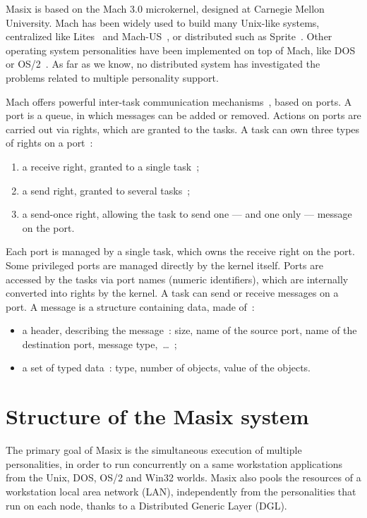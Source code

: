 Masix is based on the Mach 3.0 microkernel, designed at Carnegie Mellon 
University. 
Mach has been widely used to build many Unix-like systems, centralized like
Lites~\cite{Helander94} and Mach-US~\cite{mach-us95}, or distributed
such as Sprite~\cite{Kupfer93}. Other operating system personalities have
been implemented on top of Mach, like DOS~\cite{dos91} or OS/2~\cite{Phelan93}.
As far as we know, no distributed system has investigated the problems
related to multiple personality support.

Mach offers powerful inter-task communication mechanisms~\cite{Draves90},
based on ports. A port is a queue, in which messages can be added or removed.
Actions on ports are carried out via rights, which are granted to the tasks.
A task can own three types of rights on a port~:
\begin {enumerate}
\item a receive right, granted to a single task~;
\item a send right, granted to several tasks~;
\item a send-once right, allowing the task to send one --- and one only --- 
message on the port.
\end {enumerate}

Each port is managed by a single task, which owns the receive right on the
port. Some privileged ports are managed directly by the kernel itself.
Ports are accessed by the tasks via port names (numeric identifiers), which are
internally converted into rights by the kernel. 
A task can send or receive messages on a port. A message is a structure 
containing data, made of~:
\begin {itemize}
\item a header, describing the message~: size, name of the source
 port, name of the destination port, message type,~\dots~;
\item a set of typed data~: type, number of objects, value of the objects. 
\end {itemize}

\section{Structure of the Masix system}

The primary goal of Masix is the simultaneous
execution of multiple personalities, in order to run concurrently on 
a same workstation applications from the Unix, DOS, OS/2 and Win32 worlds.
Masix also pools the resources of a workstation local area network (LAN), 
independently from the personalities that run on each node, thanks to 
a Distributed Generic Layer (DGL).

